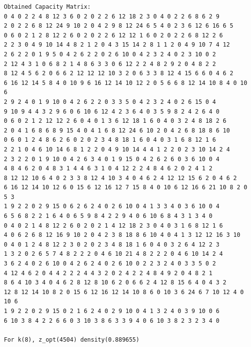 \documentclass[11pt]{article}
\begin{document}
\begin{lstlisting}
Obtained Capacity Matrix:
0 4 0 2 2 4 8 12 3 6 0 2 0 2 2 6 12 18 2 3 0 4 0 2 2 6 8 6 2 9
2 0 2 2 6 8 12 24 9 10 2 0 4 2 9 8 12 24 6 5 4 0 2 3 6 12 6 16 6 5
0 6 0 2 1 2 8 12 2 6 0 2 0 2 2 6 12 12 1 6 0 2 0 2 2 6 8 12 2 6
2 2 3 0 4 9 10 14 4 8 2 1 2 0 4 3 15 14 2 8 1 1 2 0 4 9 10 7 4 12
2 6 2 2 0 1 9 5 0 4 2 6 2 2 0 2 6 10 0 4 2 3 2 4 0 2 3 10 0 2
2 12 4 3 1 0 6 8 2 1 4 8 6 3 3 0 6 12 2 2 4 8 2 9 2 0 4 8 2 2
8 12 4 5 6 2 0 6 6 2 12 12 12 10 3 2 0 6 3 3 8 12 4 15 6 6 0 4 6 2
6 16 12 14 5 8 4 0 10 9 6 16 12 14 10 12 2 0 5 6 6 8 12 14 10 8 4 0 10 6
2 9 2 4 0 1 9 10 0 4 2 6 2 2 0 3 3 5 0 4 2 3 2 4 0 2 6 15 0 4
9 10 9 4 4 3 2 9 6 0 6 10 6 12 4 2 3 6 4 0 3 5 9 8 2 4 2 6 4 0
0 6 0 2 1 2 12 12 2 6 0 4 0 1 3 6 12 18 1 6 0 4 0 3 2 4 8 18 2 6
2 0 4 1 6 8 6 8 9 15 4 0 4 1 6 8 12 24 6 10 2 0 4 2 6 8 18 8 6 10
0 6 0 1 2 4 8 6 2 6 0 2 0 2 3 4 8 18 1 6 0 4 0 3 1 6 8 12 1 6
2 2 1 0 4 6 10 14 6 8 1 2 2 0 4 9 10 14 4 4 1 2 2 0 2 3 10 14 2 4
2 3 2 2 0 1 9 10 0 4 2 6 3 4 0 1 9 15 0 4 2 6 2 6 0 3 6 10 0 4
4 8 4 6 2 0 4 8 3 1 4 4 6 3 1 0 4 12 2 2 4 8 4 6 2 0 2 4 1 2
8 12 12 10 6 4 0 2 3 3 8 12 4 10 3 4 0 4 6 2 4 12 12 15 6 2 0 4 6 2
6 16 12 14 10 12 6 0 15 6 12 16 12 7 15 8 4 0 10 6 12 16 6 21 10 8 2 0 5 3
1 9 2 2 0 2 9 15 0 6 2 6 2 4 0 2 6 10 0 4 1 3 3 4 0 3 6 10 0 4
6 5 6 8 2 2 1 6 4 0 6 5 9 8 4 2 2 9 4 0 6 10 6 8 4 3 1 3 4 0
0 4 0 2 1 4 8 12 2 6 0 2 0 2 1 4 12 18 2 3 0 4 0 3 1 6 8 12 1 6
4 0 6 2 6 8 12 16 9 10 2 0 4 2 3 8 18 8 6 10 4 0 4 1 3 12 12 16 3 10
0 4 0 1 2 4 8 12 2 3 0 2 0 2 3 4 8 18 1 6 0 4 0 3 2 6 4 12 2 3
1 3 2 0 2 6 5 7 4 8 2 2 2 0 4 6 10 21 4 8 2 2 2 0 4 6 10 14 2 4
3 6 2 4 0 2 6 10 0 4 2 6 2 4 0 2 6 10 0 2 2 3 2 4 0 3 3 5 0 2
4 12 4 6 2 0 4 4 2 2 2 4 4 3 2 0 2 4 2 2 4 8 4 9 2 0 4 8 2 1
8 6 4 10 3 4 0 4 6 2 8 12 8 10 6 2 0 6 6 2 4 12 8 15 6 4 0 4 3 2
12 8 12 14 10 8 2 0 15 6 12 16 12 14 10 8 6 0 10 3 6 24 6 7 10 12 4 0 10 6
1 9 2 2 0 2 9 15 0 2 1 6 2 4 0 2 9 10 0 4 1 3 2 4 0 3 9 10 0 6
6 10 3 8 4 2 2 6 6 0 3 10 3 8 6 3 3 9 4 0 6 10 3 8 2 3 2 3 4 0

For k(8), z_opt(4504) density(0.889655)


\end{lstlisting}
\end{document}
